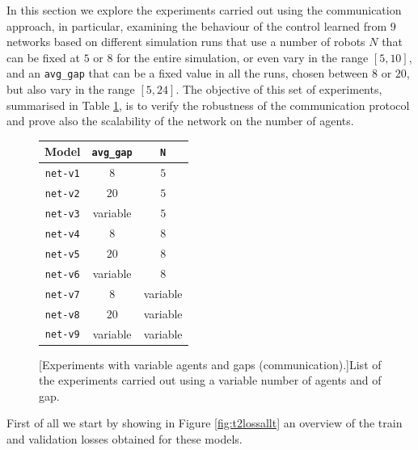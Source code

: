 In this section we explore the experiments carried out using the communication 
approach, in particular, examining the behaviour of the control learned from 9 
networks based on different simulation runs that use a number of robots $N$ that 
can be fixed at $5$ or $8$ for the entire simulation, or even vary in the range $[5, 
10]$, and an \texttt{avg\_gap} that can be a fixed value in all the runs, chosen 
between $8$ or $20$, but also vary in the range $[5, 24]$. 
The objective of this set of experiments, summarised in Table 
\ref{tab:modelcommt2}, is to verify the robustness of the communication 
protocol and prove also the scalability of the network on the number of agents.
\begin{figure}[!htb]
	\centering
	\begin{tabular}{ccc}
		\toprule
		\textbf{Model} \quad & \textbf{\texttt{avg\_gap}} & \textbf{\texttt{N}}\\
		\midrule
		\texttt{net-v1}   &  $8$		 &	 $5$ \\
		\texttt{net-v2}   &  $20$		&	$5$ \\
		\texttt{net-v3}   &  variable   &    $5$\\
		\texttt{net-v4}   &  $8$		 &	  $8$ \\
		\texttt{net-v5}   & $20$   		&	 $8$ \\
		\texttt{net-v6}   &  variable	&	 $8$ \\
		\texttt{net-v7}   &  $ 8$		  &	 variable\\
		\texttt{net-v8}   &  $20$		 &	variable\\
		\texttt{net-v9}   &  variable	 &	variable\\
		\bottomrule
	\end{tabular}
	[Experiments with variable agents and gaps 
	(communication).]{List of the experiments carried out using a variable number 
		of agents and of gap.}
	\label{tab:modelcommt2}
\end{figure}

First of all we start by showing in Figure \ref{fig:t2lossallt} an overview of the train 
and validation losses obtained for these models.

